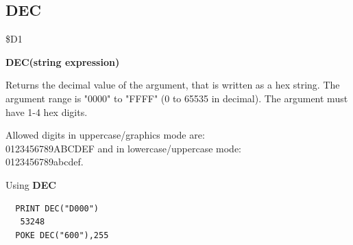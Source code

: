 \subsection{DEC}
\begin{description}[leftmargin=2cm,style=nextline]
\item [Token:] \$D1
\item [Format:] {\bf DEC(string expression)}
\item [Usage:] Returns the decimal value
               of the argument, that is written as a hex string.
               The argument range is "0000" to "FFFF" (0 to 65535 in decimal).
               The argument must have 1-4 hex digits.

\item [Remarks:] Allowed digits in uppercase/graphics mode are: \\
                 0123456789ABCDEF and in lowercase/uppercase mode: \\
                 0123456789abcdef.

\item [Example:] Using {\bf DEC}
\begin{tcolorbox}[colback=black,coltext=white]
\verbatimfont{\codefont}
\begin{verbatim}
  PRINT DEC("D000")
   53248
  POKE DEC("600"),255
\end{verbatim}
\end{tcolorbox}
\end{description}


\newpage
